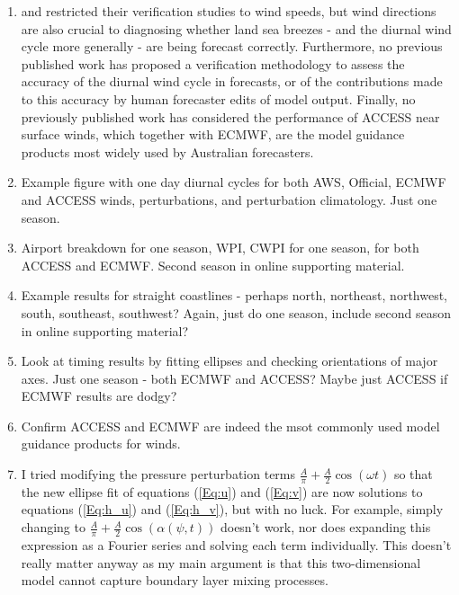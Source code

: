 \documentclass{article}
\begin{document}
\begin{enumerate}
\item
\citet{pinson12} and \citet{lynch14} restricted their verification studies to wind speeds, but wind directions are also crucial to diagnosing whether land sea breezes - and the diurnal wind cycle more generally - are being forecast correctly. Furthermore, no previous published work has proposed a verification methodology to assess the accuracy of the diurnal wind cycle in forecasts, or of the contributions made to this accuracy by human forecaster edits of model output. Finally, no previously published work has considered the performance of ACCESS near surface winds, which together with ECMWF, are the model guidance products most widely used by Australian forecasters.
\item
Example figure with one day diurnal cycles for both AWS, Official, ECMWF and ACCESS winds, perturbations, and perturbation climatology. Just one season.
\item
Airport breakdown for one season, WPI, CWPI for one season, for both ACCESS and ECMWF. Second season in online supporting material.
\item
Example results for straight coastlines - perhaps north, northeast, northwest, south, southeast, southwest? Again, just do one season, include second season in online supporting material?
\item
Look at timing results by fitting ellipses and checking orientations of major axes. Just one season - both ECMWF and ACCESS? Maybe just ACCESS if ECMWF results are dodgy?
\item
Confirm ACCESS and ECMWF are indeed the msot commonly used model guidance products for winds. 
\item
I tried modifying the pressure perturbation terms $\frac{A}{\pi} + \frac{A}{2} \cos \left(\omega t\right)$ so that the new ellipse fit of equations (\ref{Eq:u}) and (\ref{Eq:v}) are now solutions to equations (\ref{Eq:h_u}) and (\ref{Eq:h_v}), but with no luck. For example, simply changing to $\frac{A}{\pi} + \frac{A}{2} \cos \left(\alpha\left(\psi,t\right)\right)$ doesn't work, nor does expanding this expression as a Fourier series and solving each term individually. This doesn't really matter anyway as my main argument is that this two-dimensional model cannot capture boundary layer mixing processes.
\end{enumerate}
\end{document}
